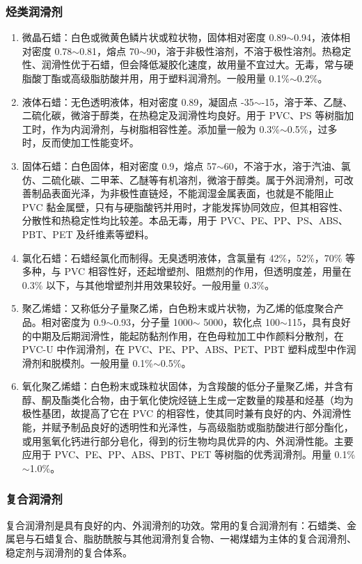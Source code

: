 \subsubsection{烃类润滑剂}
\begin{enumerate}[(1) ]
    \item 微晶石蜡：白色或微黄色鳞片状或粒状物，固体相对密度 0.89$\sim$0.94，液体相对密度 0.78$\sim$0.81，熔点 70$\sim$90\cd，溶于非极性溶剂，不溶于极性溶剂。热稳定性、润滑性优于石蜡，但会降低凝胶化速度，故用量不宜过大。无毒，常与硬脂酸丁酯或高级脂肪酸并用，用于塑料润滑剂。一般用量 0.1\%$\sim$0.2\%。
    \item 液体石蜡：无色透明液体，相对密度 0.89，凝固点 -35$\sim$-15\cd，溶于苯、乙醚、二硫化碳，微溶于醇类，在热稳定及润滑性均良好。用于 PVC、PS 等树脂加工时，作为内润滑剂，与树脂相容性差。添加量一般为 0.3\%$\sim$0.5\%，过多时，反而使加工性能变坏。
    \item 固体石蜡：白色固体，相对密度 0.9，熔点 57$\sim$60\cd，不溶于水，溶于汽油、氯仿、二硫化碳、二甲苯、乙醚等有机溶剂，微溶于醇类。属于外润滑剂，可改善制品表面光泽，为非极性直链烃，不能润湿金属表面，也就是不能阻止 PVC 黏金属壁，只有与硬脂酸钙并用时，才能发挥协同效应，但其相容性、分散性和热稳定性均比较差。本品无毒，用于 PVC、PE、PP、PS、ABS、PBT、PET 及纤维素等塑料。
    \item 氯化石蜡：石蜡经氯化而制得。无臭透明液体，含氯量有 42\%，52\%，70\% 等多种，与 PVC 相容性好，还起增塑剂、阻燃剂的作用，但透明度差，用量在 0.3\% 以下，与其他增塑剂并用效果较好。一般用量 0.3\%。
    \item 聚乙烯蜡：又称低分子量聚乙烯，白色粉末或片状物，为乙烯的低度聚合产品。相对密度为 0.9$\sim$0.93，分子量 1000$\sim$ 5000，软化点 100$\sim$115\cd，具有良好的中期及后期润滑性，能起防黏剂作用，在色母粒加工中作颜料分散剂，在 PVC-U 中作润滑剂，在 PVC、PE、PP、ABS、PET、PBT 塑料成型中作润滑剂和脱模剂。一般用量 0.1\%$\sim$0.5\%。
    \item 氧化聚乙烯蜡：白色粉末或珠粒状固体，为含羧酸的低分子量聚乙烯，并含有醇、酮及酯类化合物，由于氧化使烷烃链上生成一定数量的羧基和烃基（均为极性基团，故提高了它在 PVC 的相容性，使其同时兼有良好的内、外润滑性能，并赋予制品良好的透明性和光泽性，与高级脂肪或脂肪酸进行部分酯化，或用氢氧化钙进行部分皂化，得到的衍生物均具优异的内、外润滑性能。主要应用于 PVC、PE、PP、ABS、PBT、PET 等树脂的优秀润滑剂。用量 0.1\%$\sim$1.0\%。
\end{enumerate}

\subsubsection{复合润滑剂}
复合润滑剂是具有良好的内、外润滑剂的功效。常用的复合润滑剂有：石蜡类、金属皂与石蜡复合、脂肪酰胺与其他润滑剂复合物、一褐煤蜡为主体的复合润滑剂、稳定剂与润滑剂的复合体系。

